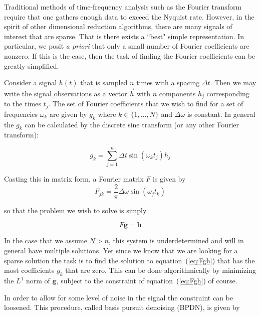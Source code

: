 \documentclass[11pt]{article}
\begin{document}
\par Traditional methods of time-frequency analysis such as the Fourier transform require that one gathers enough data to exceed the Nyquist rate. However, in the spirit of other dimensional reduction algorithms, there are many signals of interest that are sparse. That is there exists a ``best" simple representation. In particular, we posit \textit{a priori} that only a small number of Fourier coefficients are nonzero. If this is the case, then the task of finding the Fourier coefficients can be greatly simplified. \\

\par Consider a signal $h(t)$ that is sampled $n$ times with a spacing $\Delta t$. Then we may write the signal observations as a vector $\vec{h}$ with $n$ components $h_{j}$ corresponding to the times $t_{j}$. The set of Fourier coefficients that we wish to find for a set of frequencies $\omega_{k}$ are given by $g_{k}$ where $k \in \{1,...,N\}$ and $\Delta \omega$ is constant. In general the $g_{k}$ can be calculated by the discrete sine transform (or any other Fourier transform):

\begin{equation}
    g_{k} = \sum_{j=1}^{n} \Delta t \sin(\omega_{k}t_{j})h_{j}
\end{equation}

Casting this in matrix form, a Fourier matrix $F$ is given by
\begin{equation}
    F_{jk} = \frac{2}{\pi}\Delta \omega \sin(\omega_{j}t_{k})
\end{equation}

so that the problem we wish to solve is simply

\begin{equation}\label{eq:Fgh}
    F \mathbf{g} = \mathbf{h}
\end{equation}

In the case that we assume $N > n$, this system is underdetermined and will in general have multiple solutions. Yet since we know that we are looking for a sparse solution the task is to find the solution to equation~(\ref{eq:Fgh}) that has the most coefficients $g_{k}$ that are zero. This can be done algorithmically by minimizing the $L^{1}$ norm of $\mathbf{g}$, subject to the constraint of equation~(\ref{eq:Fgh}) of course. \\

\par In order to allow for some level of noise in the signal the constraint can be loosened. This procedure, called basis pursuit denoising (BPDN), is given by
\end{document}
